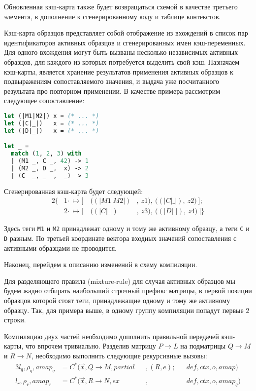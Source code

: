 Обновленная кэш-карта также будет возвращаться схемой в качестве третьего элемента, в дополнение к сгенерированному коду и таблице контекстов.

Кэш-карта образцов представляет собой отображение из вхождений в список пар идентификаторов активных образцов и сгенерированных имен кэш-переменных. Для одного вхождения могут быть вызваны несколько независимых активных образцов, для каждого из которых потребуется выделить свой кэш. Назначаем кэш-карты, является хранение результатов применения активных образцов к подвыражениям сопоставляемого значения, и выдача уже посчитанного результата про повторном применении. В качестве примера рассмотрим следующее сопоставление:

\noindent
\begin{minipage}{\linewidth}
\begin{lstlisting}[language=OCaml,escapechar=@] 
let (|M1|M2|) x = (* ... *)
let (|C|_|)   x = (* ... *) 
let (|D|_|)   x = (* ... *) 

let _ =
  match (1, 2, 3) with
  | (M1 _, C _, 42) -> 1
  | (M2 _, D _,  x) -> 2
  | (C  _, _  ,  _) -> 3
\end{lstlisting}
\end{minipage}

\noindent Сгенерированная кэш-карта будет следующей:
\begin{alignat*}{2}
\{ &1 \boldsymbol{\cdot}\ \mapsto [\ &\big((|M1|M2|)&,\ z1\big),\ \big((|C|\_|),\ z2\big)\ ];\\ 
   &2 \boldsymbol{\cdot}\ \mapsto [\ &\big((|C|\_|)&,\ z3\big),\ \big((|D|\_|),\ z4\big)\ ] \}
\end{alignat*}

\noindent Здесь теги \lstinline|M1| и \lstinline|M2| принадлежат одному и тому же активному образцу, а теги \lstinline|C| и \lstinline|D| разным. По третьей координате вектора входных значений сопоставления с активными образцами не проводится.

Наконец, перейдем к описанию изменений в схему компиляции.

Для разделяющего правила (mixture-rule) для случая активных образцов мы будем жадно отбирать наибольший строчный префикс матрицы, в первой позиции образцов которой стоят теги, принадлежащие одному и тому же активному образцу. Так, для примера выше, в одному группу компиляции попадут первые 2 строки.

Компиляцию двух частей необходимо дополнить правильной передачей кэш-карты, что впрочем тривиально. Разделив матрицу $P \to L$ на подматрицы $Q \to M$ и $R \to N$, необходимо выполнить следующие рекурсивные вызовы:
\begin{alignat*}{3}
l_q, \rho_q, amap_q &= C^*(\vec{x}, Q \to M, partial &&, (R, e); &&def, ctx, o, amap) \\
l_r, \rho_r, amap_r &= C^*(\vec{x}, R \to N, ex &&, &&def, ctx, o, amap_q)
\end{alignat*}

